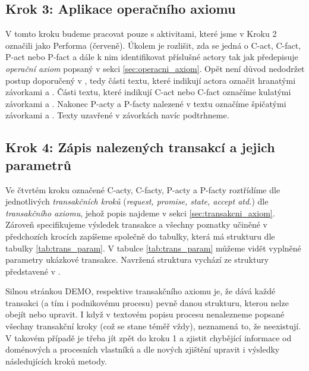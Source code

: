 \subsection{Krok 3: Aplikace operačního axiomu} \label{sec:st3_opax}
V tomto kroku budeme pracovat pouze s aktivitami, které jsme v Kroku 2 označili jako Performa (červeně). Úkolem je rozlišit, zda se jedná o C-act, C-fact, P-act nebo P-fact a dále k nim identifikovat příslušné actory tak jak předepisuje \textit{operační axiom} popsaný v sekci \ref{sec:operacni_axiom}. Opět není důvod nedodržet postup doporučený v \cite{Dietz2006}, tedy části textu, které indikují actora označit hranatými závorkami \uv{[} a \uv{]}. Části textu, které indikují C-act nebo C-fact označíme kulatými závorkami \uv{(} a \uv{)}. Nakonec P-acty a P-facty nalezené v textu označíme špičatými závorkami \uv{$<$}  a \uv{$>$}. Texty uzavřené v závorkách navíc podtrhneme.

\subsection{Krok 4: Zápis nalezených transakcí a jejich parametrů}
Ve čtvrtém kroku označené C-acty, C-facty, P-acty a P-facty roztřídíme dle jednotlivých \textit{transakčních kroků} (\textit{request, promise, state, accept atd.}) dle \textit{transakčního axiomu}, jehož popis najdeme v sekci \ref{sec:transakcni_axiom}. Zároveň specifikujeme výsledek transakce a všechny poznatky učiněné v předchozích krocích zapíšeme společně do tabulky, která má strukturu dle tabulky \ref{tab:trans_param}. V tabulce \ref{tab:trans_param} můžeme vidět vyplněné parametry ukázkové transakce. Navržená struktura vychází ze struktury představené v \cite{Naplava2015}.

Silnou stránkou DEMO, respektive transakčního axiomu je, že dává každé transakci (a tím i podnikovému procesu) pevně danou strukturu, kterou nelze obejít nebo upravit. I když v textovém popisu procesu nenalezneme popsané všechny transakční kroky (což se stane téměř vždy), neznamená to, že neexistují. V takovém případě je třeba jít zpět do kroku 1 a zjistit chybějící informace od doménových a procesních vlastníků a dle nových zjištění upravit i výsledky následujících kroků metody.

